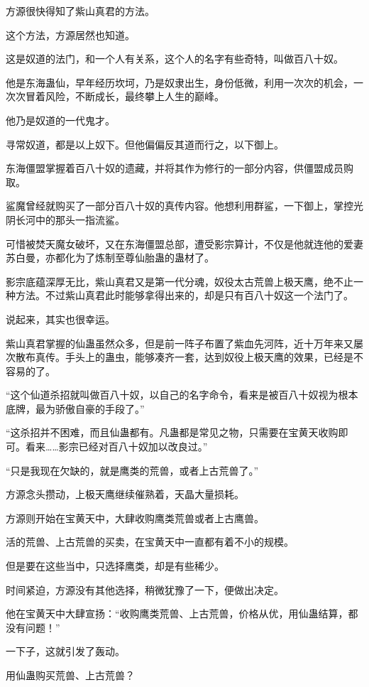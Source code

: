 \begin{this_body}
方源很快得知了紫山真君的方法。

这个方法，方源居然也知道。

这是奴道的法门，和一个人有关系，这个人的名字有些奇特，叫做百八十奴。

他是东海蛊仙，早年经历坎坷，乃是奴隶出生，身份低微，利用一次次的机会，一次次冒着风险，不断成长，最终攀上人生的巅峰。

他乃是奴道的一代鬼才。

寻常奴道，都是以上奴下。但他偏偏反其道而行之，以下御上。

东海僵盟掌握着百八十奴的遗藏，并将其作为修行的一部分内容，供僵盟成员购取。

鲨魔曾经就购买了一部分百八十奴的真传内容。他想利用群鲨，一下御上，掌控光阴长河中的那头一指流鲨。

可惜被焚天魔女破坏，又在东海僵盟总部，遭受影宗算计，不仅是他就连他的爱妻苏白曼，亦都化为了炼制至尊仙胎蛊的蛊材了。

影宗底蕴深厚无比，紫山真君又是第一代分魂，奴役太古荒兽上极天鹰，绝不止一种方法。不过紫山真君此时能够拿得出来的，却是只有百八十奴这一个法门了。

说起来，其实也很幸运。

紫山真君掌握的仙蛊虽然众多，但是前一阵子布置了紫血先河阵，近十万年来又屡次散布真传。手头上的蛊虫，能够凑齐一套，达到奴役上极天鹰的效果，已经是不容易的了。

“这个仙道杀招就叫做百八十奴，以自己的名字命令，看来是被百八十奴视为根本底牌，最为骄傲自豪的手段了。”

“这杀招并不困难，而且仙蛊都有。凡蛊都是常见之物，只需要在宝黄天收购即可。看来……影宗已经对百八十奴加以改良过。”

“只是我现在欠缺的，就是鹰类的荒兽，或者上古荒兽了。”

方源念头攒动，上极天鹰继续催熟着，天晶大量损耗。

方源则开始在宝黄天中，大肆收购鹰类荒兽或者上古鹰兽。

活的荒兽、上古荒兽的买卖，在宝黄天中一直都有着不小的规模。

但是要在这些当中，只选择鹰类，却是有些稀少。

时间紧迫，方源没有其他选择，稍微犹豫了一下，便做出决定。

他在宝黄天中大肆宣扬：“收购鹰类荒兽、上古荒兽，价格从优，用仙蛊结算，都没有问题！”

一下子，这就引发了轰动。

用仙蛊购买荒兽、上古荒兽？


\end{this_body}
